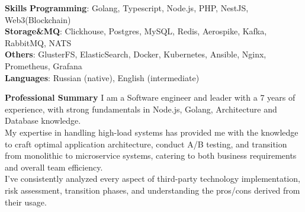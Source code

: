 \documentclass{resume} %
\begin{document}
\begin{rSection}{\textbf{Skills}}
       \textbf{Programming}: Golang, Typescript, Node.js, PHP, NestJS, Web3(Blockchain)
       \\ \textbf{Storage\&MQ}: Clickhouse, Postgres, MySQL, Redis, Aerospike, Kafka, RabbitMQ, NATS
       \\ \textbf{Others}: GlusterFS, ElasticSearch, Docker, Kubernetes, Ansible, Nginx, Prometheus, Grafana
       \\ \textbf{Languages}: Russian (native), English (intermediate)
\end{rSection}

\begin{rSection}{\textbf{Professional Summary}}
{ I am a Software engineer and leader with a 7 years of experience, with strong fundamentals in Node.js, Golang, Architecture and Database
knowledge.
\\ My expertise in handling high-load systems has provided me with the knowledge to craft optimal application architecture, conduct A/B testing, and transition from monolithic to microservice systems, catering to both business requirements and overall team efficiency.
\\ I've consistently analyzed every aspect of third-party technology implementation, risk assessment, transition phases, and understanding the pros/cons derived from their usage.
}

\end{rSection}

\end{document}
